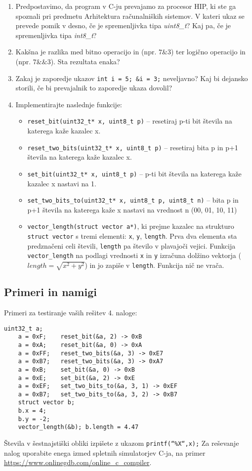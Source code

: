 \documentclass[12pt,letterpaper]{article}
\begin{document}
\begin{enumerate}
    \item Predpostavimo, da program v C-ju prevajamo za procesor HIP, ki ste ga spoznali pri predmetu Arhitektura računalniških sistemov. V kateri ukaz se prevede pomik v desno, če je spremenljivka tipa \textit{uint8\_t}? Kaj pa, če je spremenljivka tipa \textit{int8\_t}?
    \item Kakšna je razlika med bitno operacijo in (npr. $7 \& 3$) ter logično operacijo in (npr. $7 \&\& 3$). Sta rezultata enaka?
    \item Zakaj je zaporedje ukazov \texttt{int i = 5; \&i = 3;} neveljavno? Kaj bi dejansko storili, če bi prevajalnik to zaporedje ukaza dovolil?
    \item Implementirajte naslednje funkcije:
\begin{itemize}
    \item \texttt{reset\_bit(uint32\_t* x, uint8\_t p)} – resetiraj p-ti bit števila na katerega kaže kazalec x.
    \item \texttt{reset\_two\_bits(uint32\_t* x, uint8\_t p)} – resetiraj bita p in p+1 števila na katerega kaže kazalec x.
    \item \texttt{set\_bit(uint32\_t* x, uint8\_t p)} – p-ti bit števila na katerega kaže kazalec x nastavi na 1. 
    \item \texttt{set\_two\_bits\_to(uint32\_t* x, uint8\_t p, uint8\_t n)} – bita p in p+1 števila na katerega kaže x nastavi na vrednost n (00, 01, 10, 11)
    \item \texttt{vector\_length(struct vector a*)}, ki prejme kazalec na strukturo \texttt{struct vector} s tremi elementi: \texttt{x}, \texttt{y}, \texttt{length}. Prva dva elementa sta predznačeni celi števili, \texttt{length} pa število v plavajoči vejici. Funkcija \texttt{vector\_length} na podlagi vrednosti \texttt{x} in \texttt{y} izračuna dolžino vektorja ($length = \sqrt{x^2+y^2}$) in jo zapiše v \texttt{length}. Funkcija nič ne vrača.
\end{itemize}
\end{enumerate}
\newpage


\subsection*{Primeri in namigi}

Primeri za testiranje vaših rešitev 4. naloge: 
\begin{center}
\begin{lstlisting}[style=CStyle]
    uint32_t a;
    a = 0xF;    reset_bit(&a, 2) -> 0xB
    a = 0xA;    reset_bit(&a, 0) -> 0xA
    a = 0xFF;   reset_two_bits(&a, 3) -> 0xE7
    a = 0xB7;   reset_two_bits(&a, 3) -> 0xA7
    a = 0xB;    set_bit(&a, 0) -> 0xB
    a = 0xE;    set_bit(&a, 2) -> 0xE
    a = 0xEF;   set_two_bits_to(&a, 3, 1) -> 0xEF
    a = 0xB7;   set_two_bits_to(&a, 3, 2) -> 0xB7
    struct vector b;
    b.x = 4;
    b.y = -2;
    vector_length(&b); b.length = 4.47
\end{lstlisting}
\end{center}

Števila v šestnajstiški obliki izpišete z ukazom \texttt{printf(``\%X``,x);} Za reševanje nalog uporabite enega izmed spletnih simulatorjev C-ja, na primer \href{https://www.onlinegdb.com/online_c_compiler}{https://www.onlinegdb.com/online\_c\_compiler}.
\end{document}
